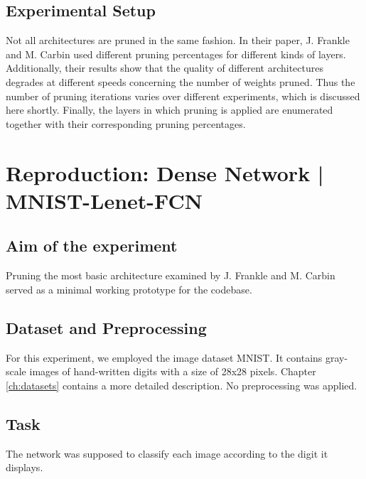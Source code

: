 \subsection*{Experimental Setup}
Not all architectures are pruned in the same fashion. In their paper, J. Frankle and M. Carbin used different pruning percentages for different kinds of layers.\cite{LTH} Additionally, their results show that the quality of different architectures degrades at different speeds concerning the number of weights pruned. Thus the number of pruning iterations varies over different experiments, which is discussed here shortly.
Finally, the layers in which pruning is applied are enumerated together with their corresponding pruning percentages.


\section{Reproduction: Dense Network | MNIST-Lenet-FCN}
\subsection*{Aim of the experiment}
Pruning the most basic architecture examined by J. Frankle and M. Carbin served as a minimal working prototype for the codebase.
\subsection*{Dataset and Preprocessing}
For this experiment, we employed the image dataset MNIST. It contains gray-scale images of hand-written digits with a size of 28x28 pixels. Chapter \ref{ch:datasets} contains a more detailed description.
No preprocessing was applied.
\subsection*{Task}
The network was supposed to classify each image according to the digit it displays.
